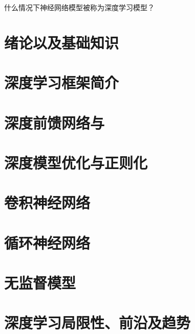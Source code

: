 \begin{Problem}
    什么情况下神经网络模型被称为深度学习模型？
    
    
    
\end{Problem}

\section{绪论以及基础知识}
\section{深度学习框架简介}
\section{深度前馈网络与}
\section{深度模型优化与正则化}
\section{卷积神经网络}
\section{循环神经网络}
\section{无监督模型}
\section{深度学习局限性、前沿及趋势}




